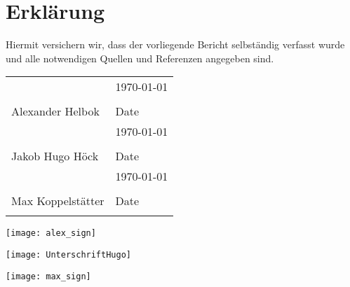 \section*{Erklärung}

Hiermit versichern wir, dass der vorliegende Bericht selbständig verfasst wurde und alle notwendigen Quellen und Referenzen angegeben sind.

\begin{tabular}{@{}p{2.5in}p{2.5in}@{}}
    \\[5\bigskipamount]
    & \hspace{2mm}\today \\[-12pt]
    \dotfill & \dotfill \\
    Alexander Helbok & Date \\[5\bigskipamount]
    & \hspace{2mm}\today \\[-12pt]
    \dotfill & \dotfill \\
    Jakob Hugo Höck & Date \\
    [5\bigskipamount]
    & \hspace{2mm}\today \\[-12pt]
    \dotfill & \dotfill \\
    Max Koppelstätter & Date \\
    \centering
\end{tabular}

\begin{minipage}{0.3\textwidth}
	\vspace{-18.5cm}
	\texttt{[image: alex\_sign]}
\end{minipage}

\begin{minipage}{0.3\textwidth}
	\vspace{-12cm}
	\texttt{[image: UnterschriftHugo]}
\end{minipage}

\begin{minipage}{0.3\textwidth}
	\vspace{-6.7cm}
	\texttt{[image: max\_sign]}
\end{minipage}